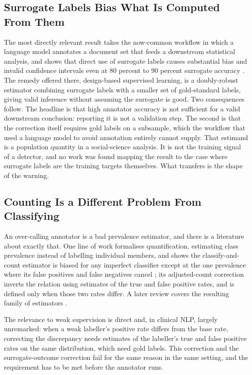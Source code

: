 \subsection{Surrogate Labels Bias What Is Computed From Them}

The most directly relevant result takes the now-common
workflow in which a language model annotates a document set that feeds a downstream statistical
analysis, and shows that direct use of surrogate labels causes substantial bias and invalid confidence
intervals even at 80 percent to 90 percent surrogate accuracy \citep{egami2023surrogates}. The remedy offered there, design-based supervised learning, is
a doubly-robust estimator combining surrogate labels with a smaller set of gold-standard labels,
giving valid inference without assuming the surrogate is good. Two consequences follow. The headline is that high annotator accuracy is
not sufficient for a valid downstream conclusion: reporting it is not a validation step. The
second is that the correction itself requires gold labels on a subsample, which the workflow that
used a language model to avoid annotation entirely cannot supply. That estimand is a population
quantity in a social-science analysis. It is not the training signal of a detector, and no work was
found mapping the result to the case where surrogate labels are the training
targets themselves. What transfers is the shape of the warning.

\subsection{Counting Is a Different Problem From Classifying}

An over-calling annotator is a bad prevalence estimator, and there is a
literature about exactly that. One line of work formalises quantification, estimating
class prevalence instead of labelling individual members, and shows the classify-and-count estimator
is biased for any imperfect classifier except at the one prevalence where its false positives and
false negatives cancel \citep{forman2008quantifying}; its adjusted-count correction inverts the relation using estimates of the
true and false positive rates, and is defined only when those two rates differ. A later review
covers the resulting family of estimators \citep{gonzalez2017quantification}.

The relevance to weak supervision is direct and, in clinical NLP, largely
unremarked: when a weak labeller's positive rate differs from the base rate,
correcting the discrepancy needs estimates of the labeller's true and false
positive rates on the same distribution, which need gold labels. This correction
and the surrogate-outcome correction \citep{egami2023surrogates} fail for the same reason in the
same setting, and the requirement has to be met before the annotator runs.

